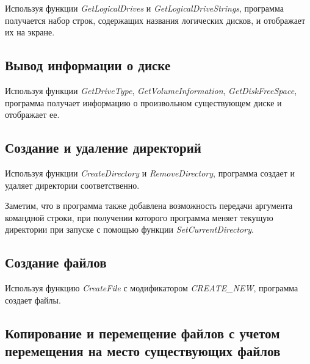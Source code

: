 \documentclass[a4paper,14pt]{extarticle}
\newcommand{\Code}[1]{\textit{#1}}
\begin{document}
Используя функции \Code{GetLogicalDrives} и \Code{GetLogicalDriveStrings},
программа получается набор строк, содержащих названия логических дисков, и
отображает их на экране.



\subsection{Вывод информации о диске}

Используя функции \Code{GetDriveType}, \Code{GetVolumeInformation},
\Code{GetDiskFreeSpace}, программа получает информацию о произвольном
существующем диске и отображает ее.



\subsection{Создание и удаление директорий}

Используя функции \Code{CreateDirectory} и \Code{RemoveDirectory}, программа
создает и удаляет директории соответственно.

Заметим, что в программа также добавлена возможность передачи аргумента
командной строки, при получении которого программа меняет текущую директории
при запуске с помощью функции \Code{SetCurrentDirectory}.



\subsection{Создание файлов}

Используя функцию \Code{CreateFile} с модификатором \Code{CREATE\_NEW},
программа создает файлы.



\subsection{Копирование и перемещение файлов с учетом перемещения на место
существующих файлов}
\end{document}
